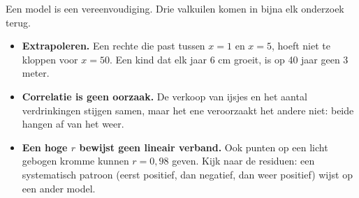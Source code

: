 Een model is een vereenvoudiging. Drie valkuilen komen in bijna elk onderzoek terug.
\begin{itemize}
\item \textbf{Extrapoleren.} Een rechte die past tussen $x = 1$ en $x = 5$, hoeft niet te kloppen voor $x = 50$. Een kind dat elk jaar 6 cm groeit, is op 40 jaar geen 3 meter.
\item \textbf{Correlatie is geen oorzaak.} De verkoop van ijsjes en het aantal verdrinkingen stijgen samen, maar het ene veroorzaakt het andere niet: beide hangen af van het weer.
\item \textbf{Een hoge $r$ bewijst geen lineair verband.} Ook punten op een licht gebogen kromme kunnen $r = 0{,}98$ geven. Kijk naar de residuen: een systematisch patroon (eerst positief, dan negatief, dan weer positief) wijst op een ander model.
\end{itemize}

\begin{oefeningen}

\end{oefeningen}

\opdrachtenkop

\begin{oefeningen}




















\end{oefeningen}

